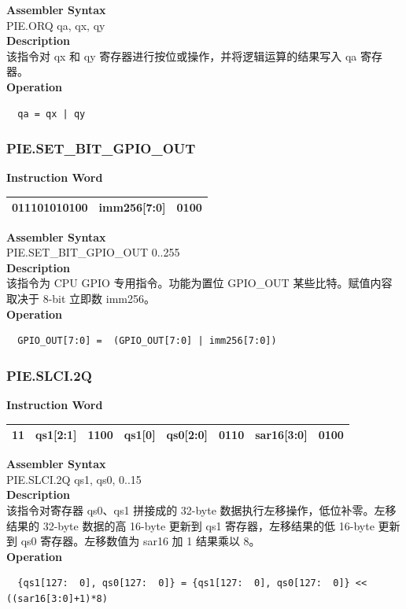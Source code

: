 \textbf{Assembler Syntax} \\
PIE.ORQ qa, qx, qy \\
\textbf{Description} \\
该指令对 qx 和 qy 寄存器进行按位或操作，并将逻辑运算的结果写入 qa 寄存器。\\
\textbf{Operation}
\begin{lstlisting}
  qa = qx | qy
\end{lstlisting}

\newpage
\subsubsection{PIE.SET\_BIT\_GPIO\_OUT}\label{instruction:PIESETBITGPIOOUT}
\setlength\tabcolsep{6pt}
\textbf{Instruction Word} \\
\begin{tabular}{|c|c|c|}
	\hline
	011101010100 & imm256[7:0] & 0100 \\
	\hline
\end{tabular}

\textbf{Assembler Syntax} \\
PIE.SET\_BIT\_GPIO\_OUT 0..255 \\
\textbf{Description} \\
该指令为 CPU GPIO 专用指令。功能为置位 GPIO\_OUT 某些比特。赋值内容取决于 8-bit 立即数 imm256。\\
\textbf{Operation}
\begin{lstlisting}
  GPIO_OUT[7:0] =  (GPIO_OUT[7:0] | imm256[7:0])
\end{lstlisting}

\newpage
\subsubsection{PIE.SLCI.2Q}\label{instruction:PIESLCI2Q}
\setlength\tabcolsep{6pt}
\textbf{Instruction Word} \\
\begin{tabular}{|c|c|c|c|c|c|c|c|}
	\hline
	11 & qs1[2:1] & 1100 & qs1[0] & qs0[2:0] & 0110 & sar16[3:0] & 0100 \\
	\hline
\end{tabular}

\textbf{Assembler Syntax} \\
PIE.SLCI.2Q qs1, qs0, 0..15 \\
\textbf{Description} \\
该指令对寄存器 qs0、qs1 拼接成的 32-byte 数据执行左移操作，低位补零。左移结果的 32-byte 数据的高 16-byte 更新到 qs1 寄存器，左移结果的低 16-byte 更新到 qs0 寄存器。左移数值为 sar16 加 1 结果乘以 8。\\
\textbf{Operation}
\begin{lstlisting}
  {qs1[127:  0], qs0[127:  0]} = {qs1[127:  0], qs0[127:  0]} << ((sar16[3:0]+1)*8)
\end{lstlisting}

